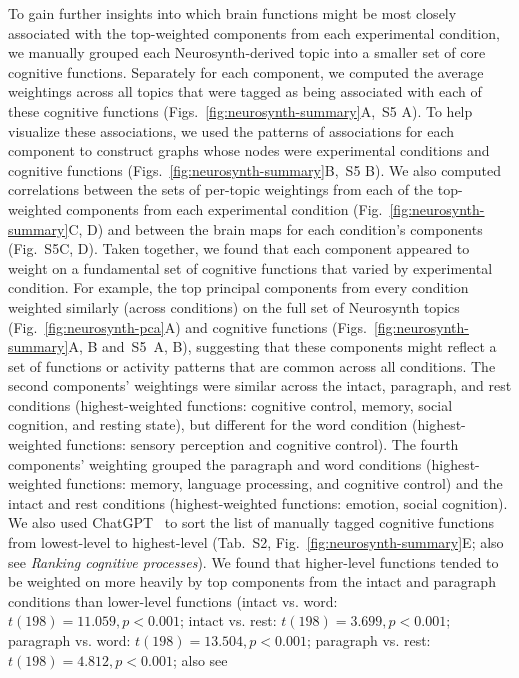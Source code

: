 \documentclass[english, 11pt]{article}
\newcommand{\neurosynthFull}{S5}
\newcommand{\topicTags}{S2}
\begin{document}
To gain further insights into which brain functions might be most closely
associated with the top-weighted components from each experimental condition,
we manually grouped each Neurosynth-derived topic into a smaller set of core
cognitive functions. Separately for each component, we computed the average
weightings across all topics that were tagged as being associated with each of
these cognitive functions (Figs.~\ref{fig:neurosynth-summary}A,~\neurosynthFull
A). To help visualize these associations, we used the patterns of associations
for each component to construct graphs whose nodes were experimental conditions
and cognitive functions (Figs.~\ref{fig:neurosynth-summary}B,~\neurosynthFull
B). We also computed correlations between the sets of per-topic weightings from
each of the top-weighted components from each experimental condition
(Fig.~\ref{fig:neurosynth-summary}C, D) and between the brain maps for each
condition's components (Fig.~\neurosynthFull C, D). Taken together, we found
that each component appeared to weight on a fundamental set of cognitive
functions that varied by experimental condition. For example, the top principal
components from every condition weighted similarly (across conditions) on the
full set of Neurosynth topics (Fig.~\ref{fig:neurosynth-pca}A) and cognitive
functions (Figs.~\ref{fig:neurosynth-summary}A, B and~\neurosynthFull~A, B),
suggesting that these components might reflect a set of functions or activity
patterns that are common across all conditions. The second components'
weightings were similar across the intact, paragraph, and rest conditions
(highest-weighted functions: cognitive control, memory, social cognition, and
resting state), but different for the word condition (highest-weighted
functions: sensory perception and cognitive control). The fourth components'
weighting grouped the paragraph and word conditions (highest-weighted
functions: memory, language processing, and cognitive control) and the intact
and rest conditions (highest-weighted functions: emotion, social cognition). We
also used ChatGPT~\citep{ChatGPT} to sort the list of manually tagged cognitive
functions from lowest-level to highest-level (Tab.~\topicTags,
Fig.~\ref{fig:neurosynth-summary}E; also see \textit{Ranking cognitive
processes}). We found that higher-level functions tended to be weighted on more
heavily by top components from the intact and paragraph conditions than
lower-level functions (intact vs. word: $t(198) = 11.059, p < 0.001$; intact
vs. rest: $t(198) = 3.699, p < 0.001$; paragraph vs. word: $t(198) = 13.504, p
< 0.001$; paragraph vs. rest: $t(198) = 4.812, p < 0.001$; also see
\end{document}
